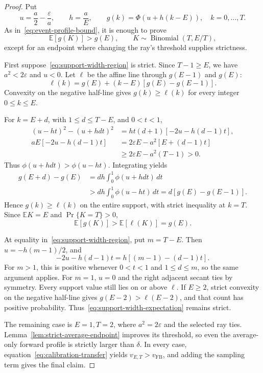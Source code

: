 \documentclass[11pt]{article}
\theoremstyle{remark}
\newcommand{\E}{\mathbb E}
\begin{document}
\begin{proof}
Put
\[
 u=\frac a2-\frac\varepsilon a,\qquad h=\frac aE,\qquad
 g(k)=\Phi(u+h(k-E)),\quad k=0,\ldots,T.
\]
As in~\eqref{eq:event-profile-bound}, it is enough to prove
\begin{equation}\label{eq:support-width-expectation}
 \E[g(K)]>g(E),\qquad K\sim\operatorname{Binomial}(T,E/T),
\end{equation}
except for an endpoint where changing the ray's threshold supplies strictness.

First suppose~\eqref{eq:support-width-region} is strict. Since $T-1\geq E$,
we have $a^2<2\varepsilon$ and $u<0$. Let $\ell$ be the affine line through
$g(E-1)$ and $g(E)$:
\[
 \ell(k)=g(E)+(k-E)[g(E)-g(E-1)].
\]
Convexity on the negative half-line gives $g(k)\geq\ell(k)$ for every
integer $0\leq k\leq E$.

For $k=E+d$, with $1\leq d\leq T-E$, and $0<t<1$,
\begin{align*}
 (u-ht)^2-(u+hdt)^2
 &=ht(d+1)[-2u-h(d-1)t],\\
 aE[-2u-h(d-1)t]
 &=2\varepsilon E-a^2[E+(d-1)t]\\
 &\geq2\varepsilon E-a^2(T-1)>0.
\end{align*}
Thus $\phi(u+hdt)>\phi(u-ht)$. Integrating yields
\begin{align*}
 g(E+d)-g(E)
 &=dh\int_0^1\phi(u+hdt)\,dt\\
 &>dh\int_0^1\phi(u-ht)\,dt
 =d[g(E)-g(E-1)].
\end{align*}
Hence $g(k)\geq\ell(k)$ on the entire support, with strict inequality at
$k=T$. Since $\E K=E$ and $\Pr\{K=T\}>0$,
\[
 \E[g(K)]>\E[\ell(K)]=g(E).
\]

At equality in~\eqref{eq:support-width-region}, put $m=T-E$. Then
$u=-h(m-1)/2$, and
\[
 -2u-h(d-1)t=h[(m-1)-(d-1)t].
\]
For $m>1$, this is positive whenever $0<t<1$ and $1\leq d\leq m$, so the
same argument applies. For $m=1$, $u=0$ and the right adjacent secant ties
by symmetry. Every support value still lies on or above $\ell$. If $E\geq2$,
strict convexity on the negative half-line gives
$g(E-2)>\ell(E-2)$, and that count has positive probability.
Thus~\eqref{eq:support-width-expectation} remains strict.

The remaining case is $E=1,T=2$, where $a^2=2\varepsilon$ and the selected
ray ties. Lemma~\ref{lem:strict-average-endpoint} improves its threshold,
so even the average-only forward profile is strictly larger than $\delta$.
In every case, equation~\eqref{eq:calibration-transfer} yields
$v_{E,T}>v_{\mathrm{FB}}$, and adding the sampling term gives the final claim.
\end{proof}
\end{document}
